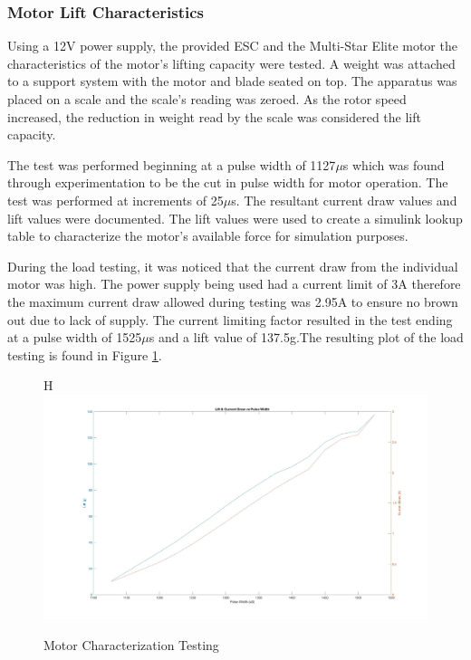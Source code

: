  \subsubsection{Motor Lift Characteristics}
 
 Using a 12V power supply, the provided ESC and the Multi-Star Elite motor the characteristics of the motor's lifting capacity were tested. A weight was attached to a support system with the motor and blade seated on top. The apparatus was placed on a scale and the scale's reading was zeroed. As the rotor speed increased, the reduction in weight read by the scale was considered the lift capacity.
 
 The test was performed beginning at a pulse width of 1127$\mu$s which was found through experimentation to be the cut in pulse width for motor operation. The test was performed at increments of 25$\mu$s. The resultant current draw values and lift values were documented. The lift values were used to create a simulink lookup table to characterize the motor's available force for simulation purposes. 
 
 During the load testing, it was noticed that the current draw from the individual motor was high. The power supply being used had a current limit of 3A therefore the maximum current draw allowed during testing was 2.95A to ensure no brown out due to lack of supply. The current limiting factor resulted in the test ending at a pulse width of 1525$\mu$s and a lift value of 137.5g.The resulting plot of the load testing is found in Figure \ref{fig:Motor_Char}.
 
 \begin{figure}{H}
	\centering
	\includegraphics[width=1\textwidth]{Motor_Characterization.jpg}
	\caption{Motor Characterization Testing}
	\label{fig:Motor_Char}
\end{figure}

